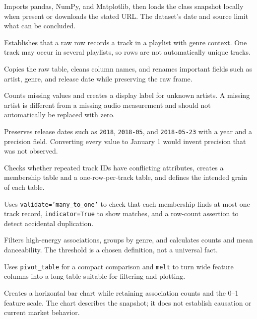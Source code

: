 \documentclass[11pt,a4paper]{article}
\begin{document}
\begin{description}[leftmargin=3.2cm,style=multiline]
    \item[Load and provenance] Imports pandas, NumPy, and Matplotlib, then loads the class snapshot locally when present or downloads the stated URL. The dataset's date and source limit what can be concluded.
    \item[Row meaning] Establishes that a raw row records a track in a playlist with genre context. One track may occur in several playlists, so rows are not automatically unique tracks.
    \item[Standardise columns] Copies the raw table, cleans column names, and renames important fields such as artist, genre, and release date while preserving the raw frame.
    \item[Missingness audit] Counts missing values and creates a display label for unknown artists. A missing artist is different from a missing audio measurement and should not automatically be replaced with zero.
    \item[Date precision] Preserves release dates such as \texttt{2018}, \texttt{2018-05}, and \texttt{2018-05-23} with a year and a precision field. Converting every value to January 1 would invent precision that was not observed.
    \item[Join preparation] Checks whether repeated track IDs have conflicting attributes, creates a membership table and a one-row-per-track table, and defines the intended grain of each table.
    \item[Protected merge] Uses \texttt{validate='many\_to\_one'} to check that each membership finds at most one track record, \texttt{indicator=True} to show matches, and a row-count assertion to detect accidental duplication.
    \item[Conditional summaries] Filters high-energy associations, groups by genre, and calculates counts and mean danceability. The threshold is a chosen definition, not a universal fact.
    \item[Reshaping] Uses \texttt{pivot\_table} for a compact comparison and \texttt{melt} to turn wide feature columns into a long table suitable for filtering and plotting.
    \item[Visualisation] Creates a horizontal bar chart while retaining association counts and the 0--1 feature scale. The chart describes the snapshot; it does not establish causation or current market behavior.
\end{description}
\end{document}
